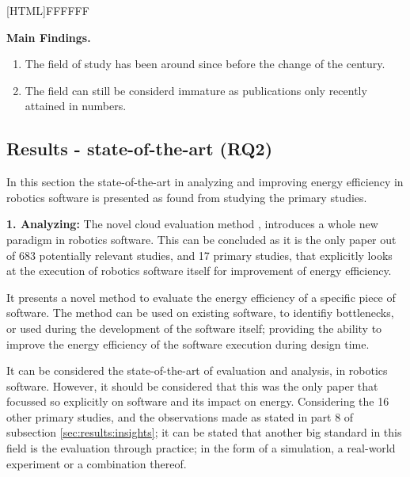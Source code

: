 \vspace{2mm}

\noindent{}[HTML]{FFFFFF}{\parbox{0.47\textwidth}{%
\noindent \textbf{Main Findings.}
\begin{enumerate}[nolistsep]
\item The field of study has been around since before the change of the century.
\item The field can still be considerd immature as publications only recently attained in numbers.
\end{enumerate}}}


\subsection{Results - state-of-the-art (RQ2)}
\label{sec:results:rq2_state_of_the_art}
In this section the state-of-the-art in analyzing and improving energy efficiency in robotics software is presented as found from studying the primary studies.

\vspace{2mm}

\noindent\textbf{1. Analyzing:}
The novel cloud evaluation method \cite{hou2017novel_cloud_evaluation_model}, introduces a whole new paradigm in robotics software.
This can be concluded as it is the only paper out of 683 potentially relevant studies, and 17 primary studies, 
that explicitly looks at the execution of robotics software itself for improvement of energy efficiency.

It presents a novel method to evaluate the energy efficiency of a specific piece of software.
The method can be used on existing software, to identifiy bottlenecks, or used during the development of the software itself;
providing the ability to improve the energy efficiency of the software execution during design time.

It can be considered the state-of-the-art of evaluation and analysis, in robotics software.
However, it should be considered that this was the only paper that focussed so explicitly on software and its impact on energy.
Considering the 16 other primary studies, and the observations made as stated in part 8 of subsection \ref{sec:results:insights}; 
it can be stated that another big standard in this field is the evaluation through practice; 
in the form of a simulation, a real-world experiment or a combination thereof.

